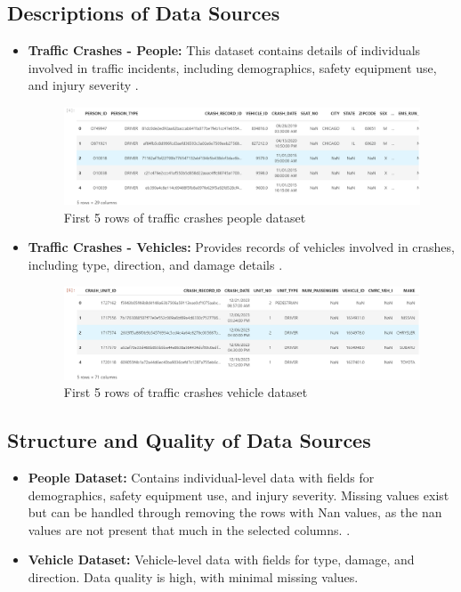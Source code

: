 \documentclass[a4paper,12pt]{article}
\begin{document}
\subsection{Descriptions of Data Sources}
\begin{itemize}
    \item \textbf{Traffic Crashes - People:} This dataset contains details of individuals involved in traffic incidents, including demographics, safety equipment use, and injury severity \cite{traffic_crashes_people}.
    
    \begin{figure}[H]
        \centering
        \includegraphics[width=1\linewidth]{images/dataset1.png}
        \caption{First 5 rows of traffic crashes people dataset}
        \label{fig:people}
    \end{figure}
    
    \item \textbf{Traffic Crashes - Vehicles:} Provides records of vehicles involved in crashes, including type, direction, and damage details \cite{traffic_crashes_vehicles}.
    
    \begin{figure}[H]
        \centering
        \includegraphics[width=1\linewidth]{images/dataset2.png}
        \caption{First 5 rows of traffic crashes vehicle dataset}
        \label{fig:vehicles}
    \end{figure}
\end{itemize}

\subsection{Structure and Quality of Data Sources}
\begin{itemize}
    \item \textbf{People Dataset:} Contains individual-level data with fields for demographics, safety equipment use, and injury severity. Missing values exist but can be handled through removing the rows with Nan values, as the nan values are not present that much in the selected columns. \cite{github_repo}.
    \item \textbf{Vehicle Dataset:} Vehicle-level data with fields for type, damage, and direction. Data quality is high, with minimal missing values.
\end{itemize}
\end{document}
